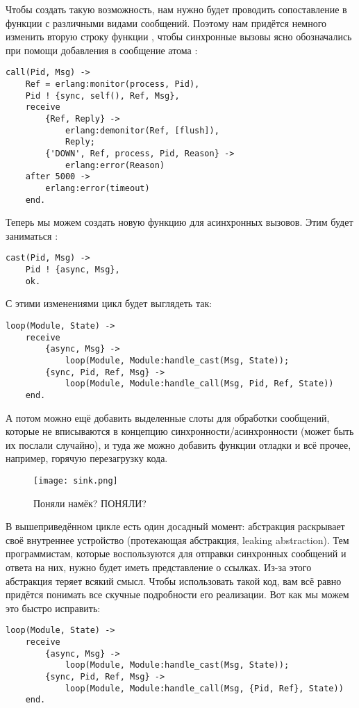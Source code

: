 Чтобы создать такую возможность, нам нужно будет проводить сопоставление  в функции  с различными видами сообщений.
Поэтому нам придётся немного изменить вторую строку функции , чтобы синхронные вызовы ясно обозначались при помощи добавления в сообщение атома :
\begin{lstlisting}[style=erlang]
call(Pid, Msg) ->
    Ref = erlang:monitor(process, Pid),
    Pid ! {sync, self(), Ref, Msg},
    receive
        {Ref, Reply} ->
            erlang:demonitor(Ref, [flush]),
            Reply;
        {'DOWN', Ref, process, Pid, Reason} ->
            erlang:error(Reason)
    after 5000 ->
        erlang:error(timeout)
    end.
\end{lstlisting}

Теперь мы можем создать новую функцию для асинхронных вызовов.
Этим будет заниматься :
\begin{lstlisting}[style=erlang]
cast(Pid, Msg) ->
    Pid ! {async, Msg},
    ok.
\end{lstlisting}
С этими изменениями цикл будет выглядеть так:
\begin{lstlisting}[style=erlang]
loop(Module, State) ->
    receive
        {async, Msg} ->
            loop(Module, Module:handle_cast(Msg, State));
        {sync, Pid, Ref, Msg} ->
            loop(Module, Module:handle_call(Msg, Pid, Ref, State))
    end.
\end{lstlisting}
А потом можно ещё добавить выделенные слоты для обработки сообщений, которые не вписываются в концепцию синхронности/асинхронности (может быть их послали случайно), и туда же можно добавить функции отладки и всё прочее, например, горячую перезагрузку кода.
\begin{wrapfigure}{r}{0.35\linewidth}
    \texttt{[image: sink.png]}
    \caption{Поняли намёк? ПОНЯЛИ?}
\end{wrapfigure}

В вышеприведённом цикле есть один досадный момент: абстракция раскрывает своё внутреннее устройство (протекающая абстракция, leaking abstraction).
Тем программистам, которые воспользуются  для отправки синхронных сообщений и ответа на них, нужно будет иметь представление о ссылках.
Из\--за этого абстракция теряет всякий смысл.
Чтобы использовать такой код, вам всё равно придётся понимать все скучные подробности его реализации.
Вот как мы можем это быстро исправить:
\begin{lstlisting}[style=erlang]
loop(Module, State) ->
    receive
        {async, Msg} ->
            loop(Module, Module:handle_cast(Msg, State));
        {sync, Pid, Ref, Msg} ->
            loop(Module, Module:handle_call(Msg, {Pid, Ref}, State))
    end.
\end{lstlisting}

